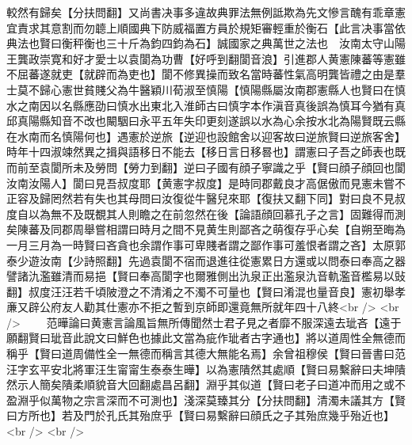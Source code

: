 較然有歸矣【分扶問翻】又尚書决事多違故典罪法無例詆欺為先文慘言醜有乖章憲宜責求其意割而勿聼上順國典下防威福置方員於規矩審輕重於衡石【此言决事當依典法也賢曰衡秤衡也三十斤為鈞四鈞為石】誠國家之典萬世之法也　汝南太守山陽王龔政崇寛和好才愛士以袁閬為功曹【好呼到翻閬音浪】引進郡人黄憲陳蕃等憲雖不屈蕃遂就吏【就辟而為吏也】閬不修異操而致名當時蕃性氣高明龔皆禮之由是羣士莫不歸心憲世貧賤父為牛醫穎川荀淑至慎陽【慎陽縣屬汝南郡憲縣人也賢曰在慎水之南因以名縣應劭曰慎水出東北入淮師古曰慎字本作滇音真後誤為慎耳今猶有真邱真陽縣知音不改也闞駰曰永平五年失印更刻遂誤以水為心余按水北為陽賢既云縣在水南而名慎陽何也】遇憲於逆旅【逆迎也設館舍以迎客故曰逆旅賢曰逆旅客舍】時年十四淑竦然異之揖與語移日不能去【移日言日移晷也】謂憲曰子吾之師表也既而前至袁閬所未及勞問【勞力到翻】逆曰子國有顔子寧識之乎【賢曰顔子顔回也閬汝南汝陽人】閬曰見吾叔度耶【黄憲字叔度】是時同郡戴良才高倨傲而見憲未嘗不正容及歸罔然若有失也其母問曰汝復從牛醫兒來耶【復扶又翻下同】對曰良不見叔度自以為無不及既覩其人則瞻之在前忽然在後【論語顔回慕孔子之言】固難得而測矣陳蕃及同郡周舉嘗相謂曰時月之間不見黄生則鄙吝之萌復存乎心矣【自朔至晦為一月三月為一時賢曰吝貪也余謂作事可卑賤者謂之鄙作事可羞恨者謂之吝】太原郭泰少遊汝南【少詩照翻】先過袁閬不宿而退進往從憲累日方還或以問泰曰奉高之器譬諸氿濫雖清而易挹【賢曰奉高閬字也爾雅側出氿泉正出濫泉氿音軌濫音檻易以䜴翻】叔度汪汪若千頃陂澄之不清淆之不濁不可量也【賢曰淆混也量音良】憲初舉孝亷又辟公府友人勸其仕憲亦不拒之暫到京師即還竟無所就年四十八終<br />
<br />
　　范曄論曰黄憲言論風旨無所傳聞然士君子見之者靡不服深遠去玼吝【遠于願翻賢曰玼音此說文曰鮮色也據此文當為疵作玼者古字通也】將以道周性全無德而稱乎【賢曰道周備性全一無德而稱言其德大無能名焉】余曾祖穆侯【賢曰晉書曰范汪字玄平安北將軍汪生甯甯生泰泰生曄】以為憲隤然其處順【賢曰易繫辭曰夫坤隤然示人簡矣隤柔順貌音大回翻處昌呂翻】淵乎其似道【賢曰老子曰道冲而用之或不盈淵乎似萬物之宗言深而不可測也】淺深莫臻其分【分扶問翻】清濁未議其方【賢曰方所也】若及門於孔氏其殆庶乎【賢曰易繫辭曰顔氏之子其殆庶幾乎殆近也】<br />
<br />
